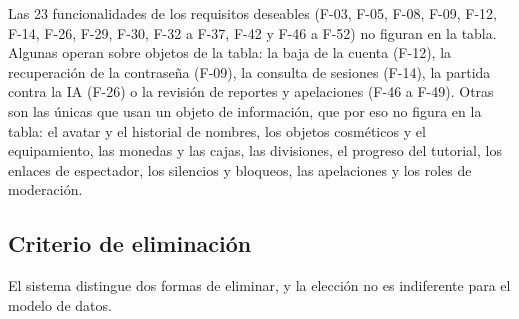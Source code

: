 Las 23 funcionalidades de los requisitos deseables (\mbox{F-03}, \mbox{F-05}, \mbox{F-08}, \mbox{F-09}, \mbox{F-12}, \mbox{F-14}, \mbox{F-26}, \mbox{F-29}, \mbox{F-30}, \mbox{F-32} a \mbox{F-37}, \mbox{F-42} y \mbox{F-46} a \mbox{F-52}) no figuran en la tabla. Algunas operan sobre objetos de la tabla: la baja de la cuenta (\mbox{F-12}), la recuperación de la contraseña (\mbox{F-09}), la consulta de sesiones (\mbox{F-14}), la partida contra la IA (\mbox{F-26}) o la revisión de reportes y apelaciones (\mbox{F-46} a \mbox{F-49}). Otras son las únicas que usan un objeto de información, que por eso no figura en la tabla: el avatar y el historial de nombres, los objetos cosméticos y el equipamiento, las monedas y las cajas, las divisiones, el progreso del tutorial, los enlaces de espectador, los silencios y bloqueos, las apelaciones y los roles de moderación.

\subsection*{Criterio de eliminación}

El sistema distingue dos formas de eliminar, y la elección no es indiferente para el modelo de datos.

